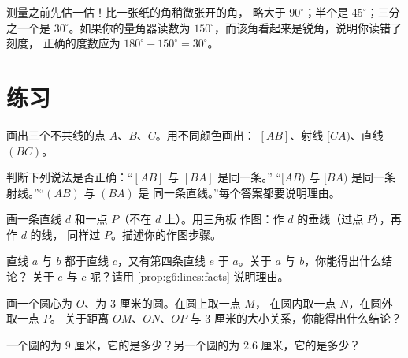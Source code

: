 \begin{example}\label{ex:g6:lines:estimate}
测量之前先估一估！比一张纸的角稍微张开的角，
略大于 $90^\circ$；半个是 $45^\circ$；三分之一个是
$30^\circ$。如果你的量角器读数为
$150^\circ$，而该角看起来是锐角，说明你读错了刻度，
正确的度数应为 $180^\circ - 150^\circ = 30^\circ$。
\end{example}

\section{练习}

\begin{exercise}[$\star$]\label{exo:g6:lines:1}
画出三个不共线的点 $A$、$B$、$C$。用不同颜色画出：
 $[AB]$、射线 $[CA)$、直线 $(BC)$。
\end{exercise}

\begin{exercise}[$\star$]\label{exo:g6:lines:2}
判断下列说法是否正确：“$[AB]$ 与 $[BA]$ 是同一条。”
“$[AB)$ 与 $[BA)$ 是同一条射线。”“$(AB)$ 与 $(BA)$ 是
同一条直线。”每个答案都要说明理由。
\end{exercise}

\begin{exercise}[$\star$]\label{exo:g6:lines:3}
画一条直线 $d$ 和一点 $P$（不在 $d$ 上）。用三角板
作图：作 $d$ 的垂线（过点 $P$），再作 $d$ 的线，
同样过 $P$。描述你的作图步骤。
\end{exercise}

\begin{exercise}[$\star$]\label{exo:g6:lines:4}
直线 $a$ 与 $b$ 都于直线 $c$，又有第四条直线
$e$ 于 $a$。关于 $a$ 与 $b$，你能得出什么结论？
关于 $e$ 与 $c$ 呢？请用 \cref{prop:g6:lines:facts} 说明理由。
\end{exercise}

\begin{exercise}[$\star$]\label{exo:g6:lines:5}
画一个圆心为 $O$、为 $3$ 厘米的圆。在圆上取一点 $M$，
在圆内取一点 $N$，在圆外取一点 $P$。
关于距离 $OM$、$ON$、$OP$ 与 $3$ 厘米的大小关系，你能得出什么结论？
\end{exercise}

\begin{exercise}[$\star$]\label{exo:g6:lines:6}
一个圆的为 $9$ 厘米，它的是多少？另一个圆的为
$2.6$ 厘米，它的是多少？
\end{exercise}

